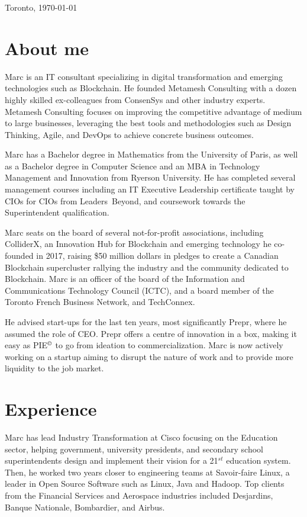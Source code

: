 \documentclass[11pt,letterpaper,sans]{moderncv}        %
\begin{document}
\maketitle
\recomputeletterlengths
\begin{flushright}
	Toronto, \today
	\vspace{-1em}
\end{flushright}
\section{About me}
Marc is an IT consultant specializing in digital transformation and emerging technologies such as Blockchain. 
He founded Metamesh Consulting with a dozen highly skilled ex-colleagues from ConsenSys and other industry experts.
Metamesh Consulting focuses on improving the competitive advantage of medium to large businesses, leveraging the best tools and methodologies such as Design Thinking, Agile, and DevOps to achieve concrete business outcomes.

Marc has a Bachelor degree in Mathematics from the University of Paris, as well as a Bachelor degree in Computer Science  and an MBA in Technology Management and Innovation from Ryerson University.
He has completed several management courses including an IT Executive Leadership certificate taught by CIOs for CIOs from Leaders~Beyond, and coursework towards the Superintendent qualification.

Marc seats on the board of several not-for-profit associations, including ColliderX, an Innovation Hub for Blockchain and emerging technology he co-founded in 2017, raising \$50 million dollars in pledges to create a Canadian Blockchain supercluster rallying the industry and the community dedicated to Blockchain. 
Marc is an officer of the board of the Information and Communications Technology Council (ICTC), and a board member of the Toronto French Business Network, and TechConnex.

He advised start-ups for the last ten years, most significantly Prepr, where he assumed the role of CEO.
Prepr offers a centre of innovation in a box, making it easy as PIE$^\copyright$ to go from ideation to commercialization.
Marc is now actively working on a startup aiming to disrupt the nature of work and to provide more liquidity to the job market. 

\section{Experience}
Marc has lead Industry Transformation at Cisco focusing on the Education sector, helping government, university presidents, and secondary school superintendents design and implement their vision for a 21$^{st}$ education system.
Then, he worked two years closer to engineering teams at Savoir-faire Linux, a leader in Open Source Software such as Linux, Java and Hadoop. %
Top clients from the Financial Services and Aerospace industries included Desjardins, Banque Nationale, Bombardier, and Airbus.
\end{document}
